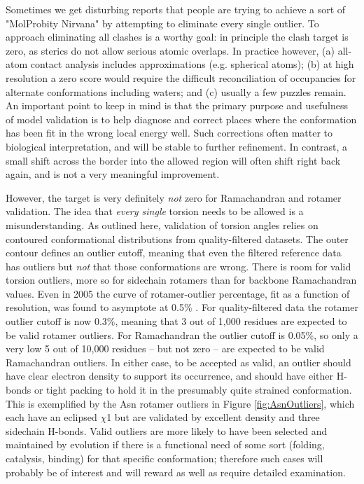 Sometimes we get disturbing reports that people are trying to achieve a sort of "MolProbity Nirvana" by attempting to eliminate every single outlier. To approach eliminating all clashes is a worthy goal: in principle the clash target is zero, as sterics do not allow serious atomic overlaps. In practice however, (a) all-atom contact analysis includes approximations (e.g. spherical atoms); (b) at high resolution a zero score would require the difficult reconciliation of occupancies for alternate conformations including waters; and (c) usually a few puzzles remain. An important point to keep in mind is that the primary purpose and usefulness of model validation is to help diagnose and correct places where the conformation has been fit in the wrong local energy well. Such corrections often matter to biological interpretation, and will be stable to further refinement. In contrast, a small shift across the border into the allowed region will often shift right back again, and is not a very meaningful improvement.

However, the target is very definitely \textit{not} zero for \textcolor{changecolor}{Ramachandran and rotamer validation. The idea that \textit{every single} torsion} needs to be allowed is a misunderstanding. As outlined here, validation of torsion angles relies on contoured conformational distributions from quality-filtered datasets. The outer contour defines an outlier cutoff, meaning that even the filtered reference data has outliers but \textit{not} that those conformations are wrong. There is room for valid torsion outliers, more so for sidechain rotamers than for backbone Ramachandran values. Even in 2005 the curve of rotamer-outlier percentage, fit as a function of resolution, was found to asymptote at 0.5\% \cite{Arendall2005}. For quality-filtered data the rotamer outlier cutoff is now 0.3\%, meaning that 3 out of 1,000 residues are expected to be valid rotamer outliers. For Ramachandran the outlier cutoff is 0.05\%, so only a very low 5 out of 10,000 residues -- but not zero -- are expected to be valid Ramachandran outliers. In either case, to be accepted as valid, an outlier should have clear electron density to support its occurrence, and should have either H-bonds or tight packing to hold it in the presumably quite strained conformation. This is exemplified by the Asn rotamer outliers in Figure \ref{fig:AsnOutliers}, which each have an eclipsed $\chi$1 but are validated by excellent density and three sidechain H-bonds.  Valid outliers are more likely to have been selected and maintained by evolution if there is a functional need of some sort (folding, catalysis, binding) for that specific conformation; therefore such cases will probably be of interest and will reward as well as require detailed examination.
